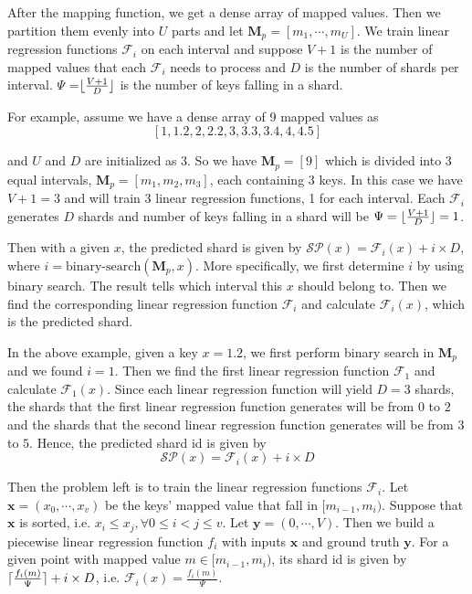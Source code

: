 After the mapping function, we get a dense array of mapped values. Then we partition them evenly into $U$ parts and let $\boldsymbol{M}_p=[m_1,\cdots, m_U]$. We train linear regression functions $\mathcal{F}_i$ on each interval and suppose $V+1$ is the number of mapped values that each $\mathcal{F}_i$ needs to process and $D$ is the number of shards per interval. $\Psi$ =$\lfloor\frac{V+1}{D}\rfloor$ is the number of keys falling in a shard. %

\begin{mscexample}
	For example, assume we have a dense array of 9 mapped values as $$[1,1.2,2, 2.2,3,3.3,3.4,4, 4.5]$$
	
and $U$ and $D$ are initialized as 3. So we have $\boldsymbol{M}_p=[9]$ which is divided into 3 equal intervals, $\boldsymbol{M}_p=[m_1, m_2, m_3]$, each containing 3 keys. In this case we have $V+1 = 3$ and will train $3$ linear regression functions, 1 for each interval. Each $\mathcal{F}_i$ generates $D$ shards and number of keys falling in a shard will be $\Psi= \lfloor\frac{V+1}{D}\rfloor = 1$.
\end{mscexample}


Then with a given $x$, the predicted shard is given by $\mathcal{SP}(x)=\mathcal{F}_i(x)+i\times D$, where $i=\text{binary-search}(\boldsymbol{M}_p,x)$. More specifically, we first determine $i$ by using binary search. The result tells which interval this $x$ should belong to. Then we find the corresponding linear regression function $\mathcal{F}_i$ and calculate $\mathcal{F}_i(x)$, which is the predicted shard.

\begin{mscexample}
	In the above example, given a key $x=1.2$, we first perform binary search in $\boldsymbol{M}_p$ and we found $i=1$. Then we find the first linear regression function $\mathcal{F}_1$ and calculate $\mathcal{F}_1(x)$. Since each linear regression function will yield $D=3$ shards, the shards that the first linear regression function generates will be from $0$ to $2$ and the shards that the second linear regression function generates will be from $3$ to $5$. Hence, the predicted shard id is given by 
$$
\mathcal{SP}(x)=\mathcal{F}_i(x)+i\times D
$$
\end{mscexample}

Then the problem left is to train the linear regression functions $\mathcal{F}_i$. Let $\boldsymbol{x}=(x_0,\cdots,x_v)$ be the keys' mapped value that fall in $[m_{i-1}, m_i)$. Suppose that $\boldsymbol{x}$ is sorted, i.e. $x_i\leq x_j, \forall 0\leq i<j\leq v$. Let $\boldsymbol{y}=(0,\cdots, V)$. Then we build a piecewise linear regression function $f_i$ with inputs $\boldsymbol{x}$ and ground truth $\boldsymbol{y}$. For a given point with mapped value $m\in[m_{i-1}, m_i)$, its shard id is given by $\lceil\frac{f_i(m)}{\Psi}\rceil+i\times D$, i.e. $\mathcal{F}_i(x)=\frac{f_i(m)}{\Psi}$.


